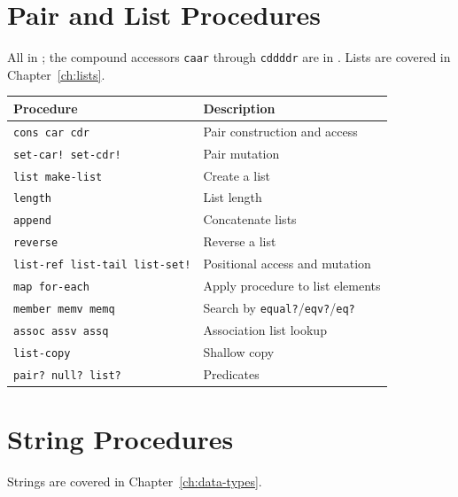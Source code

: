 \section{Pair and List Procedures}

All in ; the compound accessors \texttt{caar} through \texttt{cddddr} are in . Lists are covered in Chapter~\ref{ch:lists}.

\begin{center}
\small
\begin{tabularx}{\textwidth}{@{}lY@{}}
\textbf{Procedure} & \textbf{Description} \\
\hline
\texttt{cons car cdr} & Pair construction and access \\
\texttt{set-car! set-cdr!} & Pair mutation \\
\texttt{list make-list} & Create a list \\
\texttt{length} & List length \\
\texttt{append} & Concatenate lists \\
\texttt{reverse} & Reverse a list \\
\texttt{list-ref list-tail list-set!} & Positional access and mutation \\
\texttt{map for-each} & Apply procedure to list elements \\
\texttt{member memv memq} & Search by \texttt{equal?}/\texttt{eqv?}/\texttt{eq?} \\
\texttt{assoc assv assq} & Association list lookup \\
\texttt{list-copy} & Shallow copy \\
\texttt{pair? null? list?} & Predicates \\
\end{tabularx}
\end{center}

\section{String Procedures}

Strings are covered in Chapter~\ref{ch:data-types}.

